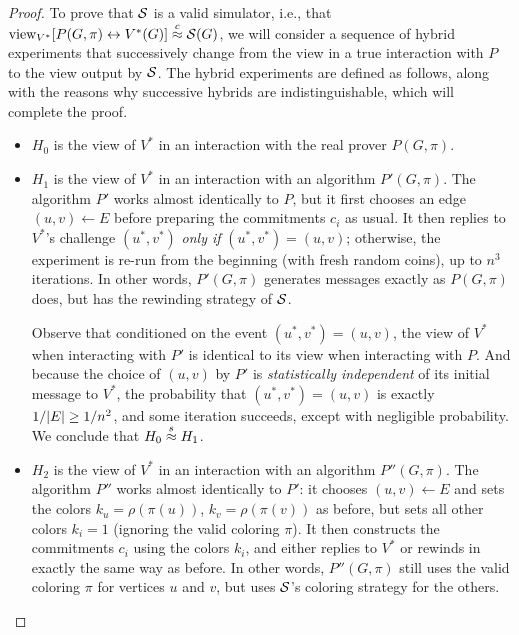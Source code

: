 \documentclass[11pt]{article}
\begin{document}
\begin{proof}
  To prove that $\mathcal{S}$ is a valid simulator, i.e., that
  $\text{view}_{V^{*}}[P(G,\pi) \leftrightarrow V^{*}(G)] \stackrel{c}{\approx} \mathcal{S}(G)$,
  we will consider a sequence of hybrid experiments that successively
  change from the view in a true interaction with $P$ to the view
  output by $\mathcal{S}$.  The hybrid experiments are defined as follows,
  along with the reasons why successive hybrids are indistinguishable,
  which will complete the proof.
  \begin{itemize}
  \item $H_{0}$ is the view of $V^{*}$ in an interaction with the real
    prover $P(G,\pi)$.
  \item $H_{1}$ is the view of $V^{*}$ in an interaction with an
    algorithm $P'(G,\pi)$.  The algorithm $P'$ works almost
    identically to $P$, but it first chooses an edge $(u,v) \gets E$
    before preparing the commitments $c_{i}$ as usual.  It then
    replies to $V^{*}$'s challenge $(u^{*},v^{*})$ \emph{only if}
    $(u^{*}, v^{*}) = (u,v)$; otherwise, the experiment is re-run from
    the beginning (with fresh random coins), up to $n^{3}$ iterations.
    In other words, $P'(G,\pi)$ generates messages exactly as
    $P(G,\pi)$ does, but has the rewinding strategy of $\mathcal{S}$.

    Observe that conditioned on the event $(u^{*}, v^{*}) = (u,v)$,
    the view of $V^{*}$ when interacting with $P'$ is identical to its
    view when interacting with $P$.  And because the choice of $(u,v)$
    by $P'$ is \emph{statistically independent} of its initial message
    to $V^{*}$, the probability that $(u^{*},v^{*}) = (u,v)$ is
    exactly $1/\lvert E\rvert \geq 1/n^{2}$, and some iteration succeeds,
    except with negligible probability.  We conclude that $H_{0}
    \stackrel{s}{\approx} H_{1}$.

  \item $H_{2}$ is the view of $V^{*}$ in an interaction with an
    algorithm $P''(G,\pi)$.  The algorithm $P''$ works almost
    identically to $P'$: it chooses $(u,v) \gets E$ and sets the
    colors $k_{u} = \rho(\pi(u))$, $k_{v} = \rho(\pi(v))$ as before,
    but sets all other colors $k_{i} = 1$ (ignoring the valid coloring
    $\pi$).  It then constructs the commitments $c_{i}$ using the
    colors $k_{i}$, and either replies to $V^{*}$ or rewinds in
    exactly the same way as before.  In other words, $P''(G,\pi)$
    still uses the valid coloring $\pi$ for vertices $u$ and $v$, but
    uses $\mathcal{S}$'s coloring strategy for the others.


\end{itemize}
\end{proof}
\end{document}
